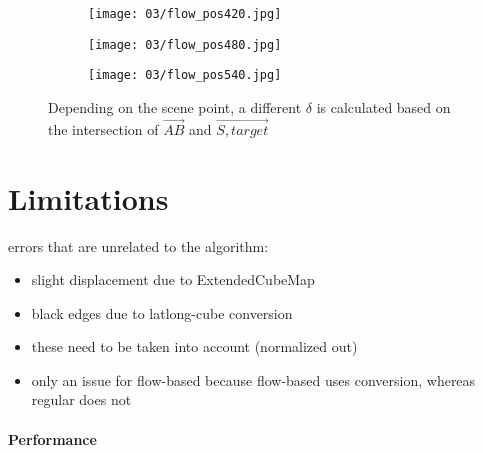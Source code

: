 \begin{figure}
\centering
    \hfill
    \begin{subfigure}[t]{0.33\textwidth}            
            \centering
            \texttt{[image: 03/flow\_pos420.jpg]}
            \caption{}
    \end{subfigure}%
    \hfill
    \begin{subfigure}[t]{0.33\textwidth}
            \centering
            \texttt{[image: 03/flow\_pos480.jpg]}
            \caption{}
    \end{subfigure}
    \hfill
    \begin{subfigure}[t]{0.33\textwidth}
            \centering
            \texttt{[image: 03/flow\_pos540.jpg]}
            \caption{}
    \end{subfigure}
    \hfill
    \caption[Different examples of $\delta$]{Depending on the scene point, a different $\delta$ is calculated based on the intersection of $\overrightarrow{AB}$ and $\overrightarrow{S,target}$} \label{fig:flow_pos}
\end{figure}

\section{Limitations}
errors that are unrelated to the algorithm:
\begin{itemize}
  \item slight displacement due to ExtendedCubeMap
  \item black edges due to latlong-cube conversion
  \item these need to be taken into account (normalized out)
  \item only an issue for flow-based because flow-based uses conversion, whereas regular does not
\end{itemize}

\paragraph{Performance}
